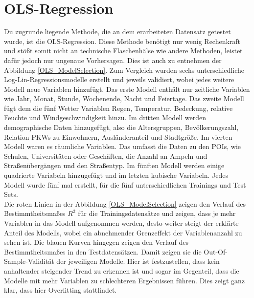 \documentclass[a4paper,12pt]{thesis}
\begin{document}
\section{OLS-Regression}

Du zugrunde liegende Methode, die an dem erarbeiteten Datensatz getestet wurde, ist die OLS-Regression. Diese Methode benötigt nur wenig Rechenkraft und stößt somit nicht an technische Flaschenhälse wie andere Methoden, leistet dafür jedoch nur ungenaue Vorhersagen. Dies ist auch zu entnehmen der Abbildung \ref{OLS_ModelSelection}. Zum Vergleich wurden sechs unterschiedliche Log-Lin-Regressionsmodelle erstellt und jeweils validiert, wobei jedes weitere Modell neue Variablen hinzufügt. Das erste Modell enthält nur zeitliche Variablen wie Jahr, Monat, Stunde, Wochenende, Nacht und Feiertage. Das zweite Modell fügt dem die fünf Wetter Variablen Regen, Temperatur, Bedeckung, relative Feuchte und Windgeschwindigkeit hinzu. Im dritten Modell werden demographische Daten hinzugefügt, also die Altersgruppen, Bevölkerungszahl, Relation PKWs zu Einwohnern, Ausländeranteil und Stadtgröße. Im vierten Modell waren es räumliche Variablen. Das umfasst die Daten zu den POIs, wie Schulen, Universitäten oder Geschäften, die Anzahl an Ampeln und Straßenübergängen und den Straßentyp. Im fünften Modell werden einige quadrierte Variabeln hinzugefügt und im letzten kubische Variabeln. Jedes Modell wurde fünf mal erstellt, für die fünf unterschiedlichen Trainings und Test Sets.\\
Die roten Linien in der Abbildung \ref{OLS_ModelSelection} zeigen den Verlauf des Bestimmtheitsmaßes $R^2$ für die Trainingsdatensätze und zeigen, dass je mehr Variablen in das Modell aufgenommen werden, desto weiter steigt der erklärte Anteil des Modells, wobei ein abnehmender Grenzeffekt der Variablenanzahl zu sehen ist. Die blauen Kurven hingegen zeigen den Verlauf des Bestimmtheitsmaßes in den Testdatensätzen. Damit zeigen sie die Out-Of-Sample-Validität der jeweiligen Modelle. Hier ist festzustellen, dass kein anhaltender steigender Trend zu erkennen ist und sogar im Gegenteil, dass die Modelle mit mehr Variablen zu schlechteren Ergebnissen führen. Dies zeigt ganz klar, dass hier Overfitting stattfindet.\\
\end{document}
